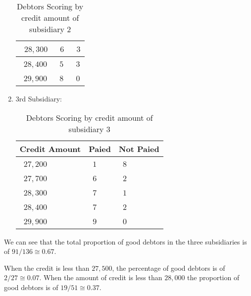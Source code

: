 \begin{enumerate}
\begin{table}[H]
\begin{center}
\begin{tabular}{|p{2cm}|p{2cm}|p{2cm}|}
						\centering\arraybackslash\ $28,300$ & \centering\arraybackslash\ $6$ & \centering\arraybackslash\ $3$ \\ \hline
						\centering\arraybackslash\ $28,400$ & \centering\arraybackslash\ $5$ & \centering\arraybackslash\ $3$ \\ \hline
						\centering\arraybackslash\ $29,900$ & \centering\arraybackslash\ $8$ & \centering\arraybackslash\ $0$ \\ \hline
				\end{tabular}
			\end{center}
			\caption[]{Debtors Scoring by credit amount of subsidiary 2}
			\end{table}
		\item 3rd Subsidiary:
		\begin{table}[H]
			\begin{center}
				\definecolor{gris}{gray}{0.85}
				\begin{tabular}{|p{2cm}|p{2cm}|p{2cm}|}
						\hline
						\multicolumn{1}{c}{\cellcolor{black!30}\textbf{Credit Amount}} & 
		  \multicolumn{1}{c}{\cellcolor{black!30}\textbf{Paied}}  & \multicolumn{1}{c}{\cellcolor{black!30}\textbf{Not Paied}}\\ \hline
						\centering\arraybackslash\ $27,200$ & \centering\arraybackslash\ $1$ & \centering\arraybackslash\ $8$ \\ \hline
						\centering\arraybackslash\ $27,700$ & \centering\arraybackslash\ $6$ & \centering\arraybackslash\ $2$ \\ \hline
						\centering\arraybackslash\ $28,300$ & \centering\arraybackslash\ $7$ & \centering\arraybackslash\ $1$ \\ \hline
						\centering\arraybackslash\ $28,400$ & \centering\arraybackslash\ $7$ & \centering\arraybackslash\ $2$ \\ \hline
						\centering\arraybackslash\ $29,900$ & \centering\arraybackslash\ $9$ & \centering\arraybackslash\ $0$ \\ \hline
				\end{tabular}
			\end{center}
			\caption[]{Debtors Scoring by credit amount of subsidiary 3}
		\end{table}
	\end{enumerate}
	We can see that the total proportion of good debtors in the three subsidiaries is of $91/136 \cong 0.67$.
	
	When the credit is less than $27,500$, the percentage of good debtors is of $2/27\cong 0.07$. When the amount of credit is less than $28,000$ the proportion of good debtors is of $19/51\cong 0.37$.
	
